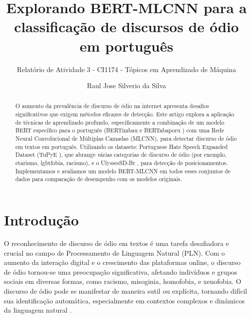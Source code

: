 \documentclass[sigconf,nonacm]{acmart}
\begin{document}
\title{Explorando BERT-MLCNN para a classificação de discursos de ódio em português}
\subtitle{Relatório de Atividade 3 - CI1174 - Tópicos em Aprendizado de Máquina}

\author{Raul Jose Silverio da Silva}

\begin{abstract}
  O aumento da prevalência de discurso de ódio na internet apresenta desafios significativos que exigem métodos eficazes de detecção. Este artigo explora a aplicação de técnicas de aprendizado profundo, especificamente a combinação de um modelo BERT específico para o português (BERTimbau \cite{souza2020bertimbau} e BERTabaporu \cite{costa-etal-2023-bertabaporu}) com uma Rede Neural Convolucional de Múltiplas Camadas (MLCNN), para detectar discurso de ódio em textos em português. Utilizando os datasets: Portuguese Hate Speech Expanded Dataset (TuPyE \cite{oliveira2023tupye}), que abrange várias categorias de discurso de ódio (por exemplo, etarismo, lgbtfobia, racismo), e o UlyssesSD-Br \cite{maia2022ulyssessd}, para detecção de posicionamentos. Implementamos e avaliamos um modelo BERT-MLCNN \cite{ATANDOH2023101578} em todos esses conjuntos de dados para comparação de desempenho com os modelos originais.
\end{abstract}


\maketitle

\section{Introdução}

O reconhecimento de discurso de ódio em textos é uma tarefa desafiadora e crucial no campo de Processamento de Linguagem Natural (PLN). Com o aumento da interação digital e o crescimento das plataformas online, o discurso de ódio tornou-se uma preocupação significativa, afetando indivíduos e grupos sociais em diversas formas, como racismo, misoginia, homofobia, e xenofobia. O discurso de ódio pode se manifestar de maneira sutil ou explícita, tornando difícil sua identificação automática, especialmente em contextos complexos e dinâmicos da linguagem natural \cite{schmidt-wiegand-2017-survey}.
\end{document}

